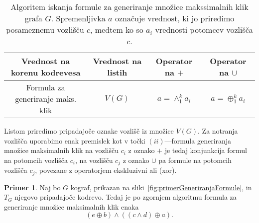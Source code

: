 \documentclass[12pt,a4paper,twoside]{article}
\theoremstyle{definition} %
\newtheorem{primer}[definicija]{Primer}
\theoremstyle{plain} %
\numberwithin{equation}{section}  %
\begin{document}
\begin{enumerate}[label=($\roman*$)]
\begin{table}[h!]
\begin{adjustbox}{width=\columnwidth,center}
\begin{tabular}{c|ccc}
Vrednost na korenu kodrevesa & Vrednost na listih   & Operator na $+$   &  Operator na $\cup$  \\ \hline
Formula za generiranje maks. klik & $V(G)$     &   $a=\land_1^k a_i $   &     $a=\oplus_1^k a_i$  
\end{tabular}
\end{adjustbox}
\caption{Algoritem iskanja formule za generiranje množice makssimalnih klik grafa $G$. Spremenljivka $a$ označuje vrednost, ki jo priredimo posameznemu vozlišču $c$, medtem ko so $a_i$ vrednosti potomcev vozlišča $c$.}
\label{tab:generiranje}
\end{table}

Listom priredimo pripadajoče oznake vozlišč iz množice $V(G)$. Za notranja vozlišča uporabimo enak premislek kot v točki $(ii)$---formula generiranja množice maksimalnih klik na vozlišču $c_i$ z oznako $+$ je tedaj konjunkcija formul na potomcih vozlišča $c_i$, na vozlišču $c_j$ z oznako $\cup$ pa formule na potomcih vozlišča $c_j$, povezane z operatorjem ekskluzivni ali (xor).

\begin{primer}\label{primerGeneriranje}
Naj bo $G$ kograf, prikazan na sliki~\ref{fig:primerGeneriranjaFormule}, in $T_G$ njegovo pripadajoče kodrevo. Tedaj je po zgornjem algoritmu formula za generiranje množice maksimalnih klik enaka
$$(e \oplus b) \land ((c \land d) \oplus a).$$

\begin{figure}[h!]
\centering
 
\hspace{15pt}
\end{figure}
\end{primer}
\end{enumerate}
\end{document}

